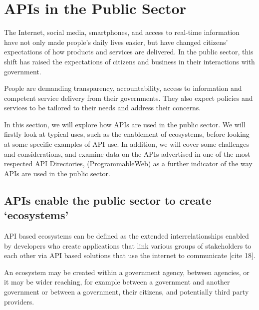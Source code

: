 
\chapter{APIs in the Public Sector}

\ifpdf
    \graphicspath{{Chapter2/Figs/Raster/}{Chapter2/Figs/PDF/}{Chapter2/Figs/}}
\else
    \graphicspath{{Chapter2/Figs/Vector/}{Chapter2/Figs/}}
\fi

The Internet, social media, smartphones, and access to real-time information
have not only made people’s daily lives easier, but have changed citizens’
expectations of how products and services are delivered. In the public sector,
this shift has raised the expectations of citizens and business in their
interactions with government.

People are demanding transparency, accountability, access to information and
competent service delivery from their governments. They also expect policies
and services to be tailored to their needs and address their concerns.

In this section, we will explore how APIs are used in the public sector.
We will firstly look at typical uses, such as the enablement of ecosystems,
before looking at some specific examples of API use. In addition, we will
cover some challenges and considerations, and examine data on the APIs
advertised in one of the most respected API Directories, (ProgrammableWeb)
as a further indicator of the way APIs are used in the public sector.


\section{APIs enable the public sector to create ‘ecosystems’}

API based ecosystems can be defined as the extended interrelationships enabled
by developers who create applications that link various groups of stakeholders
to each other via API based solutions that use the internet to communicate [cite 18].

An ecosystem may be created within a government agency, between agencies, or
it may be wider reaching, for example between a government and another government
or between a government, their citizens, and potentially third party providers.



